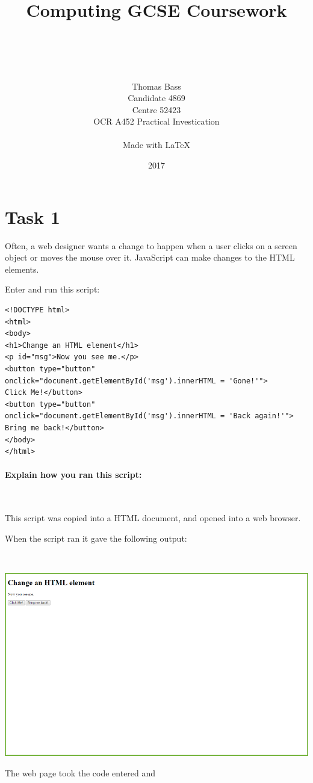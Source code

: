 \documentclass[a4paper]{article}
\title{Computing GCSE Coursework}
\author{\\ \\ \\ \\ Thomas Bass\\Candidate 4869\\Centre 52423\\OCR A452 Practical Investication\\\\Made with \LaTeX}
\date{2017}
\begin{document}
\maketitle
\pagebreak
\renewcommand*\contentsname{Summary}
\tableofcontents
\pagebreak


\section{Task 1}
Often, a web designer wants a change to happen when a user clicks on a screen object or moves the mouse over it. JavaScript can make changes to the HTML elements. \par
\noindent Enter and run this script: \par \par
\begin{lstlisting}
<!DOCTYPE html>
<html>
<body>
<h1>Change an HTML element</h1>
<p id="msg">Now you see me.</p>
<button type="button"
onclick="document.getElementById('msg').innerHTML = 'Gone!'">
Click Me!</button>
<button type="button"
onclick="document.getElementById('msg').innerHTML = 'Back again!'">
Bring me back!</button>
</body>
</html>
\end{lstlisting}


\paragraph{Explain how you ran this script:} ~\par

This script was copied into a HTML document, and opened into a web browser. 

When the script ran it gave the following output: ~\par ~\par
\noindent\includegraphics{Picture1.png} \par 

The web page took the code entered and 
\end{document}
